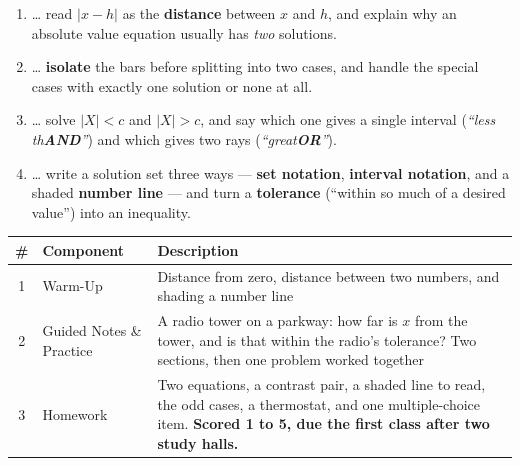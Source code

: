 \documentclass[12pt]{article}
\begin{document}

\namedateperiod
\vspace{0.18in}

\boxguard[14]
\begin{learningtargetbox}
\small
\begin{enumerate}[leftmargin=1.5em, itemsep=5pt]
  \item \ldots{} read $|x-h|$ as the \textbf{distance} between $x$ and $h$, and explain why an
        absolute value equation usually has \emph{two} solutions.
  \item \ldots{} \textbf{isolate} the bars before splitting into two cases, and handle the
        special cases with exactly one solution or none at all.
  \item \ldots{} solve $|X| < c$ and $|X| > c$, and say which one gives a single interval
        (\emph{``less th\textbf{AND}''}) and which gives two rays (\emph{``great\textbf{OR}''}).
  \item \ldots{} write a solution set three ways --- \textbf{set notation}, \textbf{interval
        notation}, and a shaded \textbf{number line} --- and turn a \textbf{tolerance} (``within
        so much of a desired value'') into an inequality.
\end{enumerate}
\end{learningtargetbox}

\vspace{0.14in}

\boxguard[14]
\begin{tocbox}
\small
\renewcommand{\arraystretch}{1.5}
\begin{tabularx}{\linewidth}{@{} c l X @{}}
\rowcolor{forestbg}
\textbf{\#} & \textbf{Component} & \textbf{Description} \\
\midrule
1 & Warm-Up & Distance from zero, distance between two numbers, and shading a number
              line \\
2 & Guided Notes \& Practice & A radio tower on a parkway: how far is $x$ from the tower, and is
              that within the radio's tolerance? Two sections, then one problem worked together \\
3 & Homework & Two equations, a contrast pair, a shaded line to read, the odd cases, a thermostat,
              and one multiple-choice item. \textbf{Scored 1 to 5, due the first class after two study halls.} \\
\end{tabularx}
\end{tocbox}
\end{document}
